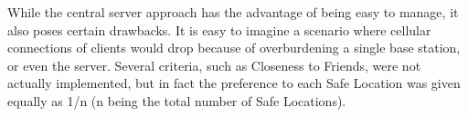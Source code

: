 
While the central server approach has the advantage of being easy to manage,
it also poses certain drawbacks. It is easy to imagine a scenario where
cellular connections of clients would drop because of overburdening a
single base station, or even the server.
Several criteria, such as Closeness to Friends, were not actually implemented,
but in fact the preference to each Safe Location was given equally as 1/n (n
being the total number of Safe Locations).
